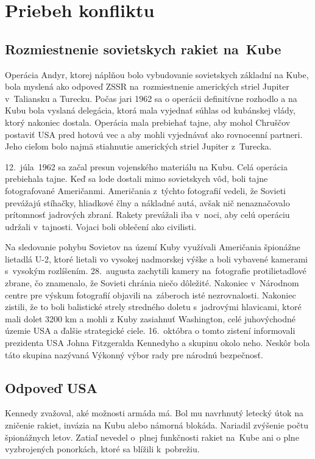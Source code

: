 \documentclass[a4paper]{article}
\begin{document}
\newpage

\section{Priebeh konfliktu}
\subsection{Rozmiestnenie sovietskych rakiet na~Kube}
Operácia Andyr, ktorej náplňou bolo vybudovanie sovietskych základní na Kube, bola myslená ako odpoveď ZSSR na~rozmiestnenie amerických striel Jupiter v~Taliansku a Turecku. Počas jari 1962 sa o operácii definitívne rozhodlo a na Kubu bola vyslaná delegácia, ktorá mala vyjednať súhlas od kubánskej vlády, ktorý nakoniec dostala. Operácia mala prebiehať tajne, aby mohol Chruščov postaviť USA pred hotovú vec a aby mohli vyjednávať ako rovnocenní partneri. Jeho cieľom bolo najmä stiahnutie amerických striel Jupiter z~Turecka.

12.~júla~1962 sa začal presun vojenského materiálu na Kubu. Celá operácia prebiehala tajne. Keď sa lode dostali mimo sovietskych vôd, boli tajne fotografované Američanmi. Američania z~týchto fotografií vedeli, že Sovieti prevážajú stíhačky, hliadkové člny a nákladné autá, avšak nič nenaznačovalo prítomnosť jadrových zbraní. Rakety prevážali iba v~noci, aby celú operáciu udržali v~tajnosti. Vojaci boli oblečení ako civilisti. \cite{13days}

Na sledovanie pohybu Sovietov na území Kuby využívali Američania špionážne lietadlá U-2, ktoré lietali vo vysokej nadmorskej výške a boli vybavené kamerami s~vysokým rozlíšením. 28.~augusta zachytili kamery na~fotografie protilietadlové zbrane, čo znamenalo, že Sovieti chránia niečo dôležité. Nakoniec v~Národnom centre pre výskum fotografií objavili na~záberoch isté nezrovnalosti. Nakoniec zistili, že to boli balistické strely stredného doletu s~jadrovými hlavicami, ktoré mali dolet 3200 km a mohli z Kuby zasiahnuť Washington, celé juhovýchodné územie USA a ďalšie strategické ciele. 16.~októbra o tomto zistení informovali prezidenta USA Johna Fitzgeralda Kennedyho a skupinu okolo neho. Neskôr bola táto skupina nazývaná Výkonný výbor rady pre národnú bezpečnosť.

\subsection{Odpoveď USA}
Kennedy zvažoval, aké možnosti armáda má. Bol mu navrhnutý letecký útok na zničenie rakiet, invázia na Kubu alebo námorná blokáda. Nariadil zvýšenie počtu špionážnych letov. Zatiaľ nevedel o~plnej funkčnosti rakiet na~Kube ani o plne vyzbrojených ponorkách, ktoré sa blížili k~pobrežiu.
\end{document}
